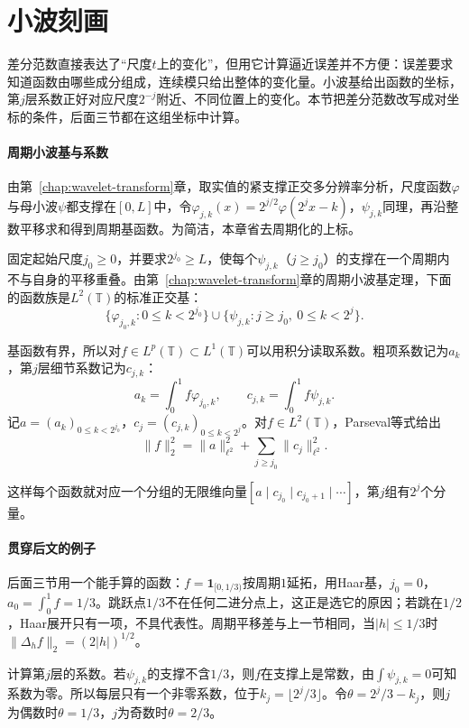 \section{小波刻画}
\label{sec:besov-wavelet}

差分范数直接表达了“尺度$t$上的变化”，但用它计算逼近误差并不方便：误差要求知道函数由哪些成分组成，连续模只给出整体的变化量。小波基给出函数的坐标，第$j$层系数正好对应尺度$2^{-j}$附近、不同位置上的变化。本节把差分范数改写成对坐标的条件，后面三节都在这组坐标中计算。

\paragraph{周期小波基与系数}
由第~\ref{chap:wavelet-transform}章，取实值的紧支撑正交多分辨率分析，尺度函数$\varphi$与母小波$\psi$都支撑在$[0,L]$中，令$\varphi_{j,k}(x)=2^{j/2}\varphi(2^jx-k)$，$\psi_{j,k}$同理，再沿整数平移求和得到周期基函数。为简洁，本章省去周期化的上标。

固定起始尺度$j_0\geq0$，并要求$2^{j_0}\geq L$，使每个$\psi_{j,k}$（$j\geq j_0$）的支撑在一个周期内不与自身的平移重叠。由第~\ref{chap:wavelet-transform}章的周期小波基定理，下面的函数族是$L^2(\mathbb T)$的标准正交基：
\[
 \{\varphi_{j_0,k}:0\leq k<2^{j_0}\}\cup\{\psi_{j,k}:j\geq j_0,\ 0\leq k<2^j\}.
\]

基函数有界，所以对$f\in L^p(\mathbb T)\subset L^1(\mathbb T)$可以用积分读取系数。粗项系数记为$a_k$，第$j$层细节系数记为$c_{j,k}$：
\[
 a_k=\int_0^1f\varphi_{j_0,k},\qquad c_{j,k}=\int_0^1f\psi_{j,k} .
\]
记$a=(a_k)_{0\leq k<2^{j_0}}$，$c_j=(c_{j,k})_{0\leq k<2^j}$。对$f\in L^2(\mathbb T)$，Parseval等式给出
\[
 \lVert f\rVert_2^2=\lVert a\rVert_{\ell^2}^2+\sum_{j\geq j_0}\lVert c_j\rVert_{\ell^2}^2 .
\]

这样每个函数就对应一个分组的无限维向量$[a\mid c_{j_0}\mid c_{j_0+1}\mid\cdots]$，第$j$组有$2^j$个分量。

\paragraph{贯穿后文的例子}
后面三节用一个能手算的函数：$f=\mathbf 1_{[0,1/3)}$按周期$1$延拓，用Haar基，$j_0=0$，$a_0=\int_0^1f=1/3$。跳跃点$1/3$不在任何二进分点上，这正是选它的原因；若跳在$1/2$，Haar展开只有一项，不具代表性。周期平移差与上一节相同，当$\lvert h\rvert\leq1/3$时$\lVert\Delta_hf\rVert_2=(2\lvert h\rvert)^{1/2}$。

计算第$j$层的系数。若$\psi_{j,k}$的支撑不含$1/3$，则$f$在支撑上是常数，由$\int\psi_{j,k}=0$可知系数为零。所以每层只有一个非零系数，位于$k_j=\lfloor2^j/3\rfloor$。令$\theta=2^j/3-k_j$，则$j$为偶数时$\theta=1/3$，$j$为奇数时$\theta=2/3$。

